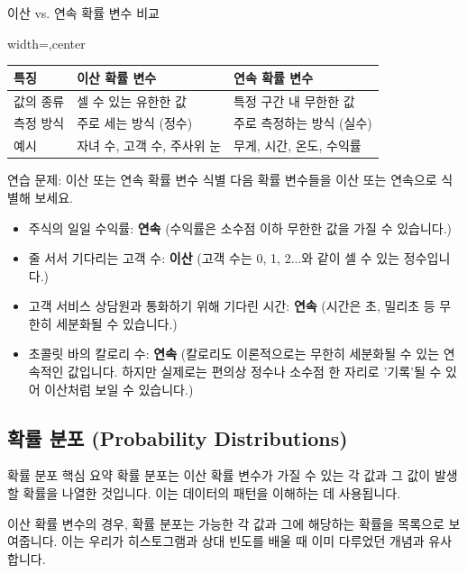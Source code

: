 \documentclass[11pt,a4paper]{article}
\begin{document}
\begin{infobox}{이산 vs. 연속 확률 변수 비교}
\begin{adjustbox}{width=\textwidth,center}
\begin{tabular}{lll}
\toprule
\textbf{특징} & \textbf{이산 확률 변수} & \textbf{연속 확률 변수} \\
\midrule
값의 종류 & 셀 수 있는 유한한 값 & 특정 구간 내 무한한 값 \\
측정 방식 & 주로 세는 방식 (정수) & 주로 측정하는 방식 (실수) \\
예시 & 자녀 수, 고객 수, 주사위 눈 & 무게, 시간, 온도, 수익률 \\
\bottomrule
\end{tabular}
\end{adjustbox}
\end{infobox}

\begin{examplebox}{연습 문제: 이산 또는 연속 확률 변수 식별}
다음 확률 변수들을 이산 또는 연속으로 식별해 보세요.
\begin{itemize}
    \item 주식의 일일 수익률: \textbf{연속} (수익률은 소수점 이하 무한한 값을 가질 수 있습니다.)
    \item 줄 서서 기다리는 고객 수: \textbf{이산} (고객 수는 0, 1, 2...와 같이 셀 수 있는 정수입니다.)
    \item 고객 서비스 상담원과 통화하기 위해 기다린 시간: \textbf{연속} (시간은 초, 밀리초 등 무한히 세분화될 수 있습니다.)
    \item 초콜릿 바의 칼로리 수: \textbf{연속} (칼로리도 이론적으로는 무한히 세분화될 수 있는 연속적인 값입니다. 하지만 실제로는 편의상 정수나 소수점 한 자리로 '기록'될 수 있어 이산처럼 보일 수 있습니다.)
\end{itemize}
\end{examplebox}

\newpage
\subsection{확률 분포 (Probability Distributions)}

\begin{summarybox}{확률 분포 핵심 요약}
확률 분포는 이산 확률 변수가 가질 수 있는 각 값과 그 값이 발생할 확률을 나열한 것입니다. 이는 데이터의 패턴을 이해하는 데 사용됩니다.
\end{summarybox}

이산 확률 변수의 경우, 확률 분포는 가능한 각 값과 그에 해당하는 확률을 목록으로 보여줍니다. 이는 우리가 히스토그램과 상대 빈도를 배울 때 이미 다루었던 개념과 유사합니다.
\end{document}
